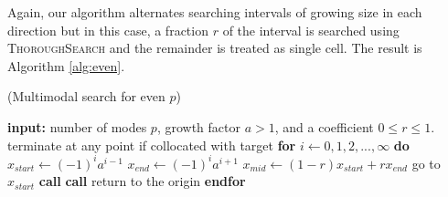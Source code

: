 Again, our algorithm alternates searching intervals of growing size in each direction but in this case, a fraction $r$ of the interval is searched using \textsc{ThoroughSearch} and the remainder is treated as single cell. The result is Algorithm \ref{alg:even}.
\begin{algorithm}[H]
  \caption{(Multimodal search for even $p$)}
  \begin{algorithmic}[1]
      \State \textbf{input:} number of modes $p$, growth factor $a>1$, and a coefficient $0\leq r\leq1$.
      \State terminate at any point if collocated with target
      \State \textbf{for} $i \gets 0,1,2, ..., \infty$ \textbf{do}   \Indent
      \State $x_{start} \gets (-1)^ia^{i-1}$
      \State $x_{end} \gets (-1)^ia^{i+1}$
      \State $x_{mid} \gets (1-r)x_{start} + rx_{end}$
      \State go to $x_{start}$
      \State \textbf{call} 
      \State \textbf{call} 
      \State return to the origin \EndIndent
      \State \textbf{endfor}
  \end{algorithmic}
\end{algorithm}

